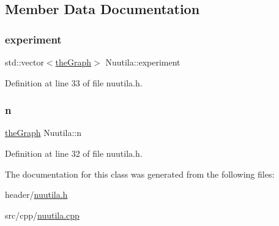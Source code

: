 \subsection{Member Data Documentation}
\mbox{\label{class_nuutila_a70e8a910cc4050d246db2540bd1e36c5}} 
\subsubsection{\texorpdfstring{experiment}{experiment}}
{\footnotesize\ttfamily std\+::vector$<$\hyperlink{class_graph_component_a982e0748a6e1b8dc74986f5f8b3dca5c}{the\+Graph}$>$ Nuutila\+::experiment}



Definition at line 33 of file nuutila.\+h.

\mbox{\label{class_nuutila_a1409929fa0f38709497f8bdb012af71c}} 
\subsubsection{\texorpdfstring{n}{n}}
{\footnotesize\ttfamily \hyperlink{class_graph_component_a982e0748a6e1b8dc74986f5f8b3dca5c}{the\+Graph} Nuutila\+::n}



Definition at line 32 of file nuutila.\+h.



The documentation for this class was generated from the following files\+:\begin{DoxyCompactItemize}
\item 
header/\hyperlink{nuutila_8h}{nuutila.\+h}\item 
src/cpp/\hyperlink{nuutila_8cpp}{nuutila.\+cpp}\end{DoxyCompactItemize}
